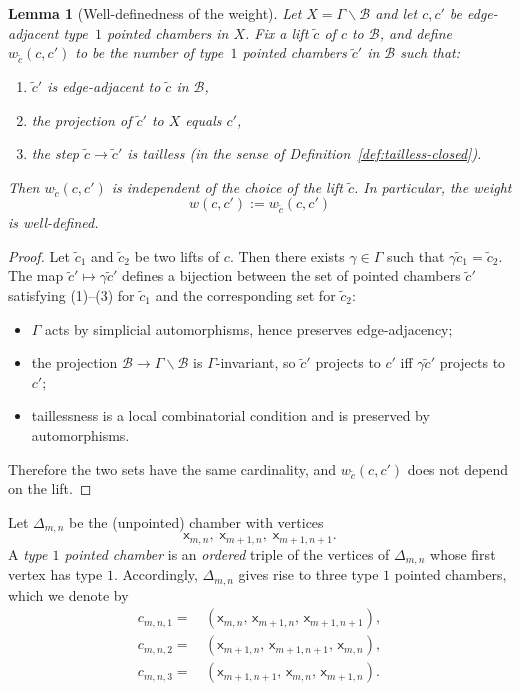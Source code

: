 \documentclass[11pt]{amsart}
\newtheorem{lem}[thm]{Lemma}
\theoremstyle{definition}
\theoremstyle{remark}
\numberwithin{equation}{section}
\begin{document}
\begin{lem}[Well-definedness of the weight]\label{lem:weight_welldefined}
Let $X=\Gamma\backslash\mathcal{B}$ and let $c,c'$ be edge-adjacent type~$1$ pointed chambers in $X$.
Fix a lift $\tilde c$ of $c$ to $\mathcal{B}$, and define $w_{\tilde c}(c,c')$ to be the number of
type~$1$ pointed chambers $\tilde c'$ in $\mathcal{B}$ such that:
\begin{enumerate}
\item $\tilde c'$ is edge-adjacent to $\tilde c$ in $\mathcal{B}$,
\item the projection of $\tilde c'$ to $X$ equals $c'$,
\item the step $\tilde c\to \tilde c'$ is tailless (in the sense of Definition~\ref{def:tailless-closed}).
\end{enumerate}
Then $w_{\tilde c}(c,c')$ is independent of the choice of the lift $\tilde c$.
In particular, the weight
\[
w(c,c'):=w_{\tilde c}(c,c')
\]
is well-defined.
\end{lem}

\begin{proof}
Let $\tilde c_1$ and $\tilde c_2$ be two lifts of $c$.
Then there exists $\gamma\in\Gamma$ such that $\gamma\tilde c_1=\tilde c_2$.
The map $\tilde c'\mapsto \gamma\tilde c'$ defines a bijection between the set of pointed chambers
$\tilde c'$ satisfying (1)--(3) for $\tilde c_1$ and the corresponding set for $\tilde c_2$:
\begin{itemize}
\item $\Gamma$ acts by simplicial automorphisms, hence preserves edge-adjacency;
\item the projection $\mathcal{B}\to \Gamma\backslash\mathcal{B}$ is $\Gamma$-invariant, so $\tilde c'$ projects to $c'$
iff $\gamma\tilde c'$ projects to $c'$;
\item taillessness is a local combinatorial condition and is preserved by automorphisms.
\end{itemize}
Therefore the two sets have the same cardinality, and $w_{\tilde c}(c,c')$ does not depend on the lift.
\end{proof}



Let $\Delta_{m,n}$ be the (unpointed) chamber with vertices
\[
\mathsf{x}_{m,n},\; \mathsf{x}_{m+1,n},\; \mathsf{x}_{m+1,n+1}.
\]
A \emph{type $1$ pointed chamber} is an \emph{ordered} triple of the vertices of $\Delta_{m,n}$ whose first vertex has type $1$.
Accordingly, $\Delta_{m,n}$ gives rise to three type $1$ pointed chambers, which we denote by
\begin{align*}
c_{m,n,1}=&\,(\mathsf{x}_{m,n},\,\mathsf{x}_{m+1,n},\,\mathsf{x}_{m+1,n+1}),\\
c_{m,n,2}=&\,(\mathsf{x}_{m+1,n},\,\mathsf{x}_{m+1,n+1},\,\mathsf{x}_{m,n}),\\
c_{m,n,3}=&\,(\mathsf{x}_{m+1,n+1},\,\mathsf{x}_{m,n},\,\mathsf{x}_{m+1,n}).
\end{align*}
\end{document}
